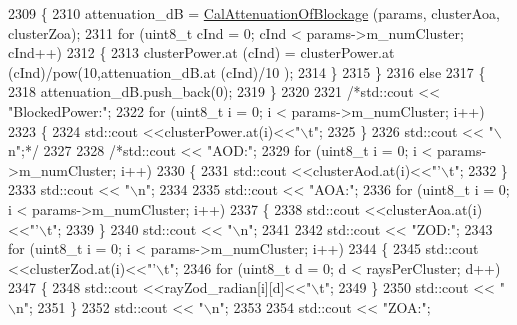 \begin{DoxyCode}
2309         \{
2310                  attenuation\_dB = \hyperlink{classns3_1_1MmWave3gppChannel_aff8853ed48d4aeb1a5d4960a843f5f1a}{CalAttenuationOfBlockage} (params, clusterAoa, 
      clusterZoa);
2311                  \textcolor{keywordflow}{for} (uint8\_t cInd = 0; cInd < params->m\_numCluster; cInd++)
2312                  \{
2313                          clusterPower.at (cInd) = clusterPower.at (cInd)/pow(10,attenuation\_dB.at (cInd)/10
      );
2314                  \}
2315         \}
2316         \textcolor{keywordflow}{else}
2317         \{
2318                 attenuation\_dB.push\_back(0);
2319         \}
2320 
2321         \textcolor{comment}{/*std::cout << "BlockedPower:";}
2322 \textcolor{comment}{        for (uint8\_t i = 0; i < params->m\_numCluster; i++)}
2323 \textcolor{comment}{        \{}
2324 \textcolor{comment}{                std::cout <<clusterPower.at(i)<<"\(\backslash\)t";}
2325 \textcolor{comment}{        \}}
2326 \textcolor{comment}{        std::cout << "\(\backslash\)n";*/}
2327 
2328         \textcolor{comment}{/*std::cout << "AOD:";}
2329 \textcolor{comment}{        for (uint8\_t i = 0; i < params->m\_numCluster; i++)}
2330 \textcolor{comment}{        \{}
2331 \textcolor{comment}{                std::cout <<clusterAod.at(i)<<"'\(\backslash\)t";}
2332 \textcolor{comment}{        \}}
2333 \textcolor{comment}{        std::cout << "\(\backslash\)n";}
2334 \textcolor{comment}{}
2335 \textcolor{comment}{        std::cout << "AOA:";}
2336 \textcolor{comment}{        for (uint8\_t i = 0; i < params->m\_numCluster; i++)}
2337 \textcolor{comment}{        \{}
2338 \textcolor{comment}{                std::cout <<clusterAoa.at(i)<<"'\(\backslash\)t";}
2339 \textcolor{comment}{        \}}
2340 \textcolor{comment}{        std::cout << "\(\backslash\)n";}
2341 \textcolor{comment}{}
2342 \textcolor{comment}{        std::cout << "ZOD:";}
2343 \textcolor{comment}{        for (uint8\_t i = 0; i < params->m\_numCluster; i++)}
2344 \textcolor{comment}{        \{}
2345 \textcolor{comment}{                std::cout <<clusterZod.at(i)<<"'\(\backslash\)t";}
2346 \textcolor{comment}{                for (uint8\_t d = 0; d < raysPerCluster; d++)}
2347 \textcolor{comment}{                \{}
2348 \textcolor{comment}{                        std::cout <<rayZod\_radian[i][d]<<"\(\backslash\)t";}
2349 \textcolor{comment}{                \}}
2350 \textcolor{comment}{                std::cout << "\(\backslash\)n";}
2351 \textcolor{comment}{        \}}
2352 \textcolor{comment}{        std::cout << "\(\backslash\)n";}
2353 \textcolor{comment}{}
2354 \textcolor{comment}{        std::cout << "ZOA:";}

\end{DoxyCode}
